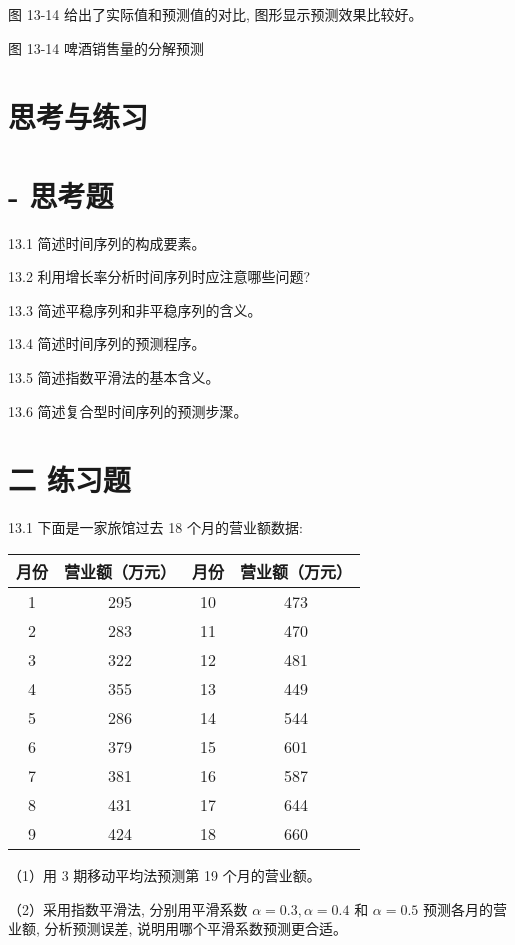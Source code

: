 \documentclass[10pt]{article}
\begin{document}
\begin{CJK*}{UTF8}{bsmi}
图 13-14 给出了实际值和预测值的对比, 图形显示预测效果比较好。

\begin{center}
\end{center}

图 13-14 啤酒销售量的分解预测

\section*{思考与练习}
\section*{- 思考题}
13.1 简述时间序列的构成要素。

13.2 利用增长率分析时间序列时应注意哪些问题?

13.3 简述平稳序列和非平稳序列的含义。

13.4 简述时间序列的预测程序。

13.5 简述指数平滑法的基本含义。

13.6 简述复合型时间序列的预测步㵵。

\section*{二 练习题}
13.1 下面是一家旅馆过去 18 个月的营业额数据:

\begin{center}
\begin{tabular}{|c|c|c|c|}
\hline
月份 & 营业额（万元） & 月份 & 营业额（万元） \\
\hline
1 & 295 & 10 & 473 \\
\hline
2 & 283 & 11 & 470 \\
\hline
3 & 322 & 12 & 481 \\
\hline
4 & 355 & 13 & 449 \\
\hline
5 & 286 & 14 & 544 \\
\hline
6 & 379 & 15 & 601 \\
\hline
7 & 381 & 16 & 587 \\
\hline
8 & 431 & 17 & 644 \\
\hline
9 & 424 & 18 & 660 \\
\hline
\end{tabular}
\end{center}

（1）用 3 期移动平均法预测第 19 个月的营业额。

（2）采用指数平滑法, 分别用平滑系数 $\alpha=0.3, \alpha=0.4$ 和 $\alpha=0.5$ 预测各月的营业额, 分析预测误差, 说明用哪个平滑系数预测更合适。


\end{CJK*}
\end{document}
